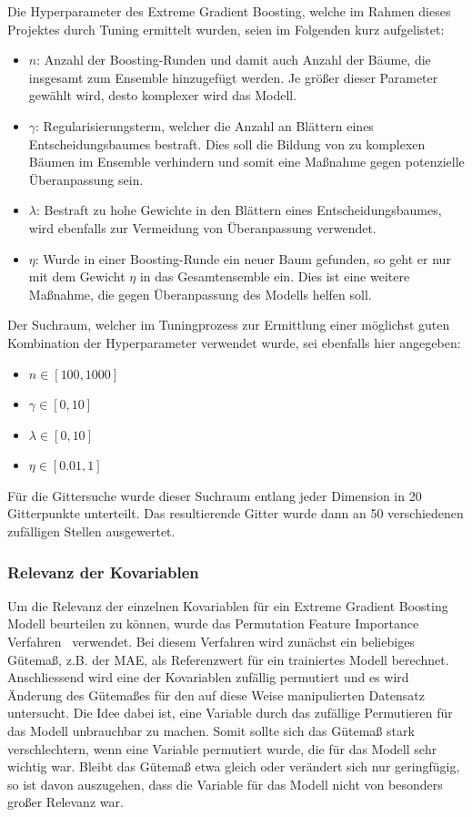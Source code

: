 Die Hyperparameter des Extreme Gradient Boosting, welche im Rahmen dieses Projektes durch Tuning
ermittelt wurden, seien im Folgenden kurz aufgelistet:
\begin{itemize}
    \item $n$: Anzahl der Boosting-Runden und damit auch Anzahl der B\"aume, die insgesamt zum Ensemble hinzugef\"ugt werden.
        Je gr\"o{\ss}er dieser Parameter gew\"ahlt wird, desto komplexer wird das Modell.
    \item $\gamma$: Regularisierungsterm, welcher die Anzahl an Bl\"attern eines Entscheidungsbaumes bestraft.
        Dies soll die Bildung von zu komplexen B\"aumen im Ensemble verhindern und somit eine Ma{\ss}nahme gegen potenzielle
        \"Uberanpassung sein.
    \item $\lambda$: Bestraft zu hohe Gewichte in den Bl\"attern eines Entscheidungsbaumes, wird ebenfalls zur Vermeidung von
        \"Uberanpassung verwendet.
    \item $\eta$: Wurde in einer Boosting-Runde ein neuer Baum gefunden, so geht er nur mit dem Gewicht $\eta$ in das 
        Gesamtensemble ein. Dies ist eine weitere Ma{\ss}nahme, die gegen \"Uberanpassung des Modells helfen soll.
\end{itemize}
Der Suchraum, welcher im Tuningprozess zur Ermittlung einer m\"oglichst guten Kombination der Hyperparameter verwendet wurde, 
sei ebenfalls hier angegeben:
\begin{itemize}
    \item $n \in \left[100, 1000 \right]$
    \item $\gamma \in \left[0, 10 \right]$
    \item $\lambda \in \left[0, 10 \right]$
    \item $\eta \in \left[0.01, 1 \right]$
\end{itemize}
F\"ur die Gittersuche wurde dieser Suchraum entlang jeder Dimension in 20 Gitterpunkte unterteilt. Das resultierende Gitter wurde
dann an 50 verschiedenen zuf\"alligen Stellen ausgewertet.

\subsubsection{Relevanz der Kovariablen}
\label{sec:xgboost-relevanz}

Um die Relevanz der einzelnen Kovariablen f\"ur ein Extreme Gradient Boosting Modell beurteilen zu k\"onnen, wurde
das Permutation Feature Importance Verfahren~\cite{molnar2019} verwendet.
Bei diesem Verfahren wird zun\"achst ein beliebiges G\"utema{\ss}, z.B. der MAE, als Referenzwert f\"ur ein trainiertes Modell
berechnet. Anschliessend wird eine der Kovariablen zuf\"allig permutiert und es wird \"Anderung des G\"utema{\ss}es f\"ur den auf
diese Weise manipulierten Datensatz untersucht.
Die Idee dabei ist, eine Variable durch das zuf\"allige Permutieren f\"ur das Modell unbrauchbar zu machen.
Somit sollte sich das G\"utema{\ss} stark verschlechtern, wenn eine Variable permutiert wurde, die f\"ur das Modell sehr wichtig war.
Bleibt das G\"utema{\ss} etwa gleich oder ver\"andert sich nur geringf\"ugig, so ist davon auszugehen, dass die Variable 
f\"ur das Modell nicht von besonders gro{\ss}er Relevanz war.

